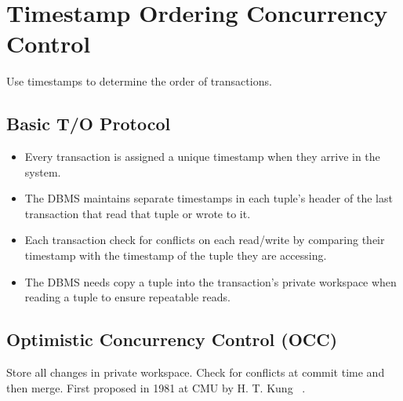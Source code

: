 \documentclass[11pt]{article}
\begin{document}
\section{Timestamp Ordering Concurrency Control}
Use timestamps to determine the order of transactions.

\subsection*{Basic T/O Protocol}
\begin{itemize}
    \item
    Every transaction is assigned a unique timestamp when they arrive in the system.
    
    \item
    The DBMS maintains separate timestamps in each tuple's header of the last transaction that read 
    that tuple or wrote to it.
    
    \item
    Each transaction check for conflicts on each read/write by comparing their timestamp with the 
    timestamp of the tuple they are accessing.
    
    \item
    The DBMS needs copy a tuple into the transaction's private workspace when reading a tuple to 
    ensure repeatable reads.
\end{itemize}

\subsection*{Optimistic Concurrency Control (OCC)}
Store all changes in private workspace.
Check for conflicts at commit time and then merge.
First proposed in 1981 at CMU by H. T. Kung ~\cite{p213-kung}.
\end{document}
